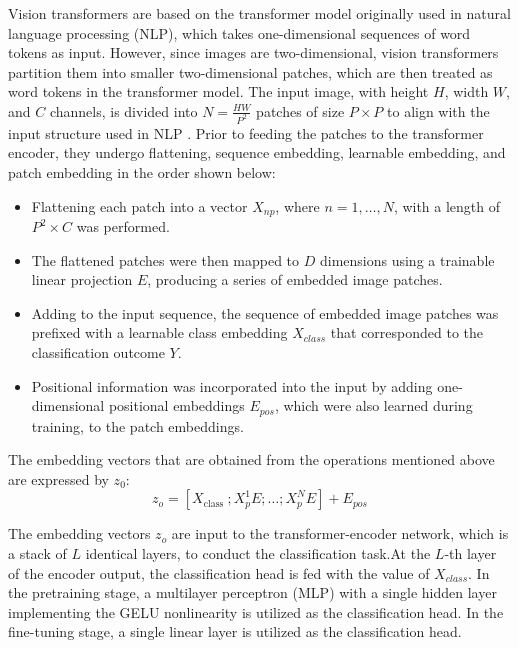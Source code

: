 \documentclass{article}
\begin{document}
Vision transformers\cite{dosovitskiy2020image} are based on the transformer model originally used in natural language processing (NLP), which takes one-dimensional sequences of word tokens as input. However, since images are two-dimensional, vision transformers partition them into smaller two-dimensional patches, which are then treated as word tokens in the transformer model. The input image, with height $H$, width $W$, and $C$ channels, is divided into $N=\frac{H W}{P^2}$ patches of size $P \times P$ to align with the input structure used in NLP \cite{ayana2022buvitnet}. Prior to feeding the patches to the transformer encoder, they undergo flattening, sequence embedding, learnable embedding, and patch embedding in the order shown below:
\begin{itemize}
\item Flattening each patch into a vector $X_{np}$, where $n = 1, \ldots, N$, with a length of $P^2 \times C$ was performed.
\item The flattened patches were then mapped to $D$ dimensions using a trainable linear projection $E$, producing a series of embedded image patches.
\item Adding to the input sequence, the sequence of embedded image patches was prefixed with a learnable class embedding $X_{class}$ that corresponded to the classification outcome $Y$.
\item Positional information was incorporated into the input by adding one-dimensional positional embeddings $E_{pos}$, which were also learned during training, to the patch embeddings.
\end{itemize}

The embedding vectors that are obtained from the operations mentioned above are expressed by $z_{0}$:
\begin{equation}
z_o=\left[X_{\text {class }} ; X_p^1 E ; \ldots ; X_p^N E\right]+E_{p o s}
\end{equation}


 The embedding vectors $z_o$ are input to the transformer-encoder network, which is a stack of $L$ identical layers, to conduct the classification task.At the $L$-th layer of the encoder output, the classification head is fed with the value of $X_{class}$. In the pretraining stage, a multilayer perceptron (MLP) with a single hidden layer implementing the GELU nonlinearity is utilized as the classification head. In the fine-tuning stage, a single linear layer is utilized as the classification head.
\end{document}
